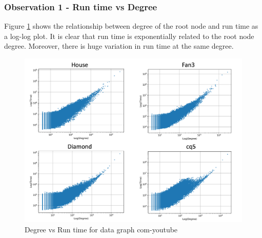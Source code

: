 \subsubsection*{Observation 1 - Run time vs Degree}
Figure \ref{fig:run-time-vs-degree} shows the relationship between degree of the root node and run time as a log-log plot.
It is clear that run time is exponentially related to the root node degree. Moreover, there is huge variation in run time at the same degree.
\begin{figure}
    \includegraphics[width=\textwidth]{fig/improvements/time-vs-degree.png}
    \caption{Degree vs Run time for data graph com-youtube}
    \label{fig:run-time-vs-degree}
\end{figure}


